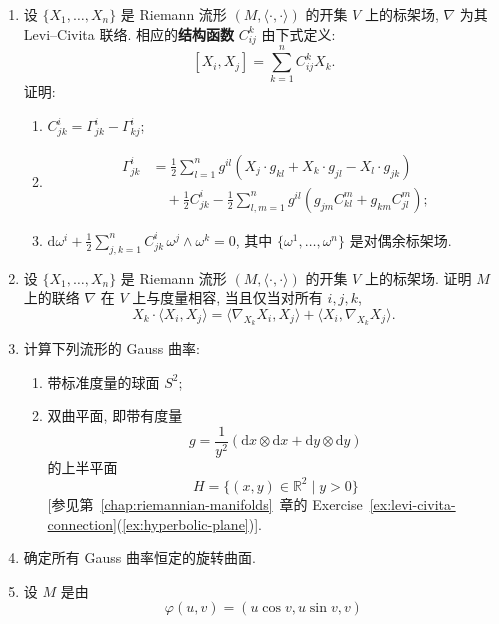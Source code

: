 \begin{RiemannExercise}\label{ex:cartan-structure-equations}
\begin{enumerate}[label=(\arabic*),ref=\arabic*,leftmargin=*]
\item\label{ex:structure-functions-of-frame} 设 $\{X_1,\ldots,X_n\}$ 是 Riemann 流形 $(M,\langle\cdot,\cdot\rangle)$ 的开集 $V$ 上的标架场, $\nabla$ 为其 Levi–Civita 联络. 相应的\textbf{结构函数} $C_{ij}^k$ 由下式定义:
\[
  [X_i,X_j]=\sum_{k=1}^n C_{ij}^kX_k.
\]
证明:
\begin{enumerate}[label=(\alph*),leftmargin=*]
\item $C_{jk}^i=\Gamma_{jk}^i-\Gamma_{kj}^i$;
\item
\begin{align*}
  \Gamma_{jk}^i&=\frac12\sum_{l=1}^n g^{il}(X_j\cdot g_{kl}+X_k\cdot g_{jl}-X_l\cdot g_{jk})\\
  &\quad+\frac12 C_{jk}^i-\frac12\sum_{l,m=1}^n g^{il}(g_{jm}C_{kl}^m+g_{km}C_{jl}^m);
\end{align*}
\item $\mathrm{d}\omega^i+\frac12\sum_{j,k=1}^nC_{jk}^i\,\omega^j\wedge\omega^k=0$, 其中 $\{\omega^1,\ldots,\omega^n\}$ 是对偶余标架场.
\end{enumerate}
\item\label{ex:metric-compatibility-on-frame} 设 $\{X_1,\ldots,X_n\}$ 是 Riemann 流形 $(M,\langle\cdot,\cdot\rangle)$ 的开集 $V$ 上的标架场. 证明 $M$ 上的联络 $\nabla$ 在 $V$ 上与度量相容, 当且仅当对所有 $i,j,k$,
\[
  X_k\cdot\langle X_i,X_j\rangle
   =\langle\nabla_{X_k}X_i,X_j\rangle+\langle X_i,\nabla_{X_k}X_j\rangle.
\]
\item\label{ex:gauss-curvature-of-sphere-and-hyperbolic-plane} 计算下列流形的 Gauss 曲率:
\begin{enumerate}[label=(\alph*),leftmargin=*]
\item 带标准度量的球面 $S^2$;
\item 双曲平面, 即带有度量
\[
  g=\frac1{y^2}(\mathrm{d}x\otimes\mathrm{d}x+\mathrm{d}y\otimes\mathrm{d}y)
\]
的上半平面
\[
  H=\{(x,y)\in\mathbb{R}^2\mid y>0\}
\]
[参见第~\ref{chap:riemannian-manifolds}~章的 Exercise~\ref{ex:levi-civita-connection}(\ref{ex:hyperbolic-plane})].
\end{enumerate}
\item\label{ex:surfaces-of-revolution-with-constant-gauss-curvature} 确定所有 Gauss 曲率恒定的旋转曲面.
\item\label{ex:curvature-preserving-map-not-local-isometry} 设 $M$ 是由
\[
  \varphi(u,v)=(u\cos v,u\sin v,v)
\]
\end{enumerate}
\end{RiemannExercise}
